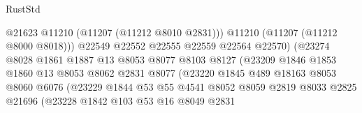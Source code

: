 \begin{lexlean}{RustStd}
\begin{coremodule}
                                          @21623
                                          @11210
                                          (@11207 (@11212 @8010 @2831)))
                                        @11210
                                        (@11207 (@11212 @8000 @8018)))
                                      @22549
                                      @22552
                                      @22555
                                      @22559
                                      @22564
                                      @22570)
                                    (@23274
                                      @8028
                                      @1861
                                      @1887
                                      @13
                                      @8053
                                      @8077
                                      @8103
                                      @8127
                                      (@23209
                                        @1846
                                        @1853
                                        @1860
                                        @13
                                        @8053
                                        @8062
                                        @2831
                                        @8077
                                        (@23220
                                          @1845
                                          @489
                                          @18163
                                          @8053
                                          @8060
                                          @6076
                                          (@23229
                                            @1844
                                            @53
                                            @55
                                            @4541
                                            @8052
                                            @8059
                                            @2819
                                            @8033
                                            @2825
                                            @21696
                                            (@23228
                                              @1842
                                              @103
                                              @53
                                              @16
                                              @8049
                                              @2831

\end{coremodule}
\end{lexlean}
